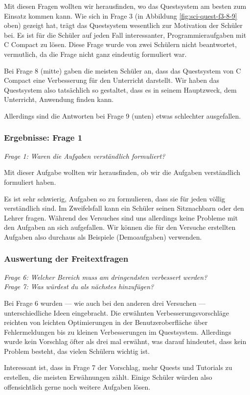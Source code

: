 Mit diesen Fragen wollten wir herausfinden, wo das Questsystem am besten zum Einsatz kommen kann. Wie sich in Frage 3 (in Abbildung \ref{fig:sci-quest-f3-8-9} oben) gezeigt hat, trägt das Questsystem wesentlich zur Motivation der Schüler bei. Es ist für die Schüler auf jeden Fall interessanter, Programmieraufgaben mit C Compact zu lösen. Diese Frage wurde von zwei Schülern nicht beantwortet, vermutlich, da die Frage nicht ganz eindeutig formuliert war.

Bei Frage 8 (mitte) gaben die meisten Schüler an, dass das Questsystem von C Compact eine Verbesserung für den Unterricht darstellt. Wir haben das Questsystem also tatsächlich so gestaltet, dass es in seinem Hauptzweck, dem Unterricht, Anwendung finden kann.

Allerdings sind die Antworten bei Frage 9 (unten) etwas schlechter ausgefallen.

\subsubsection*{Ergebnisse: Frage 1}

\emph{Frage 1: Waren die Aufgaben verständlich formuliert?}

Mit dieser Aufgabe wollten wir herausfinden, ob wir die Aufgaben verständlich formuliert haben.

Es ist sehr schwierig, Aufgaben so zu formulieren, dass sie für jeden völlig verständlich sind. Im Zweifelsfall kann ein Schüler seinen Sitznachbarn oder den Lehrer fragen. Während des Versuches sind uns allerdings keine Probleme mit den Aufgaben an sich aufgefallen. Wir können die für den Versuche erstellten Aufgaben also durchaus als Beispiele (Demoaufgaben) verwenden.

\subsubsection*{Auswertung der Freitextfragen}

\emph{Frage 6: Welcher Bereich muss am dringendsten verbessert werden?\\
Frage 7: Was würdest du als nächstes hinzufügen?}

Bei Frage 6 wurden --- wie auch bei den anderen drei Versuchen --- unterschiedliche Ideen eingebracht. Die erwähnten Verbesserungsvorschläge reichten von leichten Optimierungen in der Benutzeroberfläche über Fehlermeldungen bis zu kleinen Verbesserungen im Questsystem. Allerdings wurde kein Vorschlag öfter als drei mal erwähnt, was darauf hindeutet, dass kein Problem besteht, das vielen Schülern wichtig ist.

Interessant ist, dass in Frage 7 der Vorschlag, mehr Quests und Tutorials zu erstellen, die meisten Erwähnungen zählt. Einige Schüler würden also offensichtlich gerne noch weitere Aufgaben lösen.

